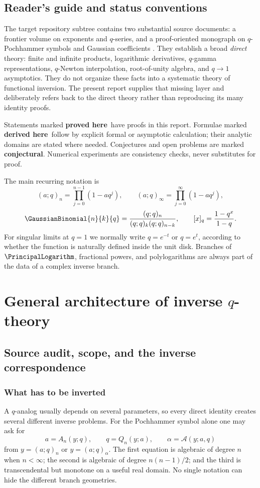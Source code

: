 \documentclass[11pt,oneside]{book}
\theoremstyle{definition}
\theoremstyle{remark}
\newcommand{\statusproved}{\textcolor{deepgreen}{\textbf{proved here}}}
\newcommand{\statusderived}{\textcolor{linkblue}{\textbf{derived here}}}
\newcommand{\statusconj}{\textcolor{deepred}{\textbf{conjectural}}}
\begin{document}
\chapter*{Reader's guide and status conventions}
The target repository subtree contains two substantial source documents: a
frontier volume on exponents and $q$-series, and a proof-oriented monograph on
$q$-Pochhammer symbols and Gaussian coefficients
\cite{ProveItFrontiers,ProveItMonograph}.  They establish a broad \emph{direct}
theory: finite and infinite products, logarithmic derivatives, $q$-gamma
representations, $q$-Newton interpolation, root-of-unity algebra, and
$q\to1$ asymptotics.  They do not organize these facts into a systematic
theory of functional inversion.  The present report supplies that missing
layer and deliberately refers back to the direct theory rather than reproducing
its many identity proofs.

Statements marked \statusproved\ have proofs in this report.  Formulae marked
\statusderived\ follow by explicit formal or asymptotic calculation; their
analytic domains are stated where needed.  Conjectures and open problems are
marked \statusconj.  Numerical experiments are consistency checks, never
substitutes for proof.

The main recurring notation is
\[
 (a;q)_n=\prod_{j=0}^{n-1}(1-aq^j),\qquad
 (a;q)_\infty=\prod_{j=0}^{\infty}(1-aq^j),
\]
\[
 \GaussianBinomial{n}{k}{q}=\frac{(q;q)_n}{(q;q)_k(q;q)_{n-k}},\qquad
 [x]_q=\frac{1-q^x}{1-q}.
\]
For singular limits at $q=1$ we normally write $q=e^{-t}$ or $q=e^t$,
according to whether the function is naturally defined inside the unit disk.
Branches of $\PrincipalLogarithm$, fractional powers, and polylogarithms are always part of
the data of a complex inverse branch.

\tableofcontents

\mainmatter

\part{General architecture of inverse $q$-theory}

\chapter{Source audit, scope, and the inverse correspondence}

\section{What has to be inverted}
A $q$-analog usually depends on several parameters, so every direct identity
creates several different inverse problems.  For the Pochhammer symbol alone
one may ask for
\[
 a=A_n(y;q),\qquad q=Q_n(y;a),\qquad
 \alpha=\mathcal A(y;a,q)
\]
from $y=(a;q)_n$ or $y=(a;q)_\alpha$.  The first equation is algebraic of
degree $n$ when $n<\infty$; the second is algebraic of degree
$n(n-1)/2$; and the third is transcendental but monotone on a useful real
domain.  No single notation can hide the different branch geometries.
\end{document}
